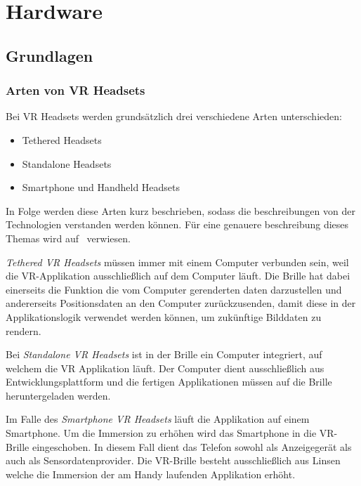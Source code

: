 \section{Hardware}

\subsection{Grundlagen}
\label{sec:basics}

\subsubsection{Arten von VR Headsets}
\label{sec:vr-headset-types}

Bei VR Headsets werden grundsätzlich drei verschiedene Arten unterschieden:

\begin{itemize}
    \item Tethered Headsets
    \item Standalone Headsets
    \item Smartphone und Handheld Headsets
\end{itemize}

In Folge werden diese Arten kurz beschrieben, sodass die beschreibungen von der Technologien verstanden werden können.
Für eine genauere beschreibung dieses Themas wird auf~\cite{ANIWAA_TEAM_2021} verwiesen.

\emph{Tethered VR Headsets} müssen immer mit einem Computer verbunden sein, weil die VR-Applikation ausschließlich auf dem Computer läuft.
Die Brille hat dabei einerseits die Funktion die vom Computer gerenderten daten darzustellen und andererseits Positionsdaten an den Computer zurückzusenden, damit diese in der Applikationslogik verwendet werden können, um zukünftige Bilddaten zu rendern.

Bei \emph{Standalone VR Headsets} ist in der Brille ein Computer integriert, auf welchem die VR Applikation läuft.
Der Computer dient ausschließlich aus Entwicklungsplattform und die fertigen Applikationen müssen auf die Brille heruntergeladen werden.

Im Falle des \emph{Smartphone VR Headsets} läuft die Applikation auf einem Smartphone.
Um die Immersion zu erhöhen wird das Smartphone in die VR-Brille eingeschoben.
In diesem Fall dient das Telefon sowohl als Anzeigegerät als auch als Sensordatenprovider.
Die VR-Brille besteht ausschließlich aus Linsen welche die Immersion der am Handy laufenden Applikation erhöht.

